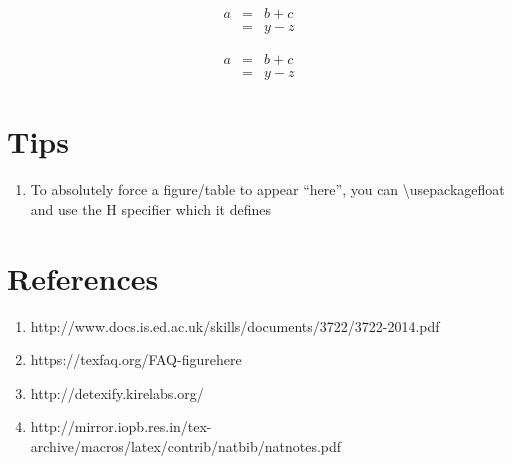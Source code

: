 \documentclass[a4paper,12pt]{article}
\begin{document}
\begin{eqnarray*}
a & = & b + c \\
  & = & y - z
\end{eqnarray*}


\begin{eqnarray}
a & = & b + c \\
  & = & y - z
\end{eqnarray}

\section{Tips}

\begin{enumerate}
\item To absolutely force a figure/table to appear “here”, you can \textbackslash usepackage{float} and use the H specifier which it defines
\end{enumerate}

\section{References}

\begin{enumerate}
\item http://www.docs.is.ed.ac.uk/skills/documents/3722/3722-2014.pdf
\item https://texfaq.org/FAQ-figurehere
\item http://detexify.kirelabs.org/
\item http://mirror.iopb.res.in/tex-archive/macros/latex/contrib/natbib/natnotes.pdf
\end{enumerate}
\end{document}
